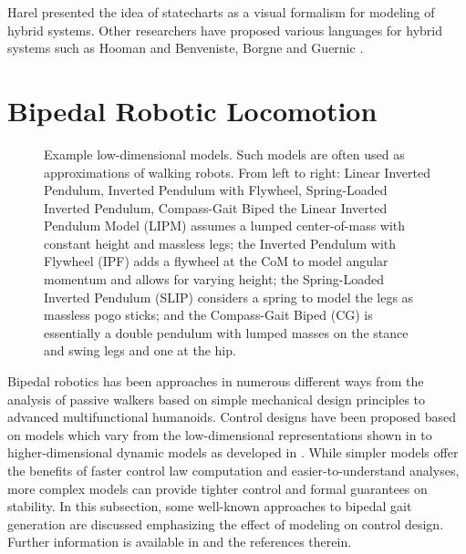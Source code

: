 Harel \cite{Harel1987} presented the idea of statecharts as a visual formalism
for modeling of hybrid systems.
%
Other researchers have proposed various languages for hybrid systems such as
Hooman \cite{Hooman1993} and Benveniste, Borgne and Guernic \cite{Benveniste1993}.




\section{Bipedal Robotic Locomotion} \label{sec:literature-bipeds}

\begin{figure}
  \centering
  \def\svgwidth{1.0\columnwidth}
  
  \caption[Example low-dimensional models.]{%
    Example low-dimensional models.
    Such models are often used as approximations of walking robots.
    From left to right:
    Linear Inverted Pendulum, Inverted Pendulum with Flywheel, Spring-Loaded
    Inverted Pendulum, Compass-Gait Biped
    the Linear Inverted Pendulum Model (LIPM) assumes a lumped center-of-mass
    with constant height and massless legs;
    the Inverted Pendulum with Flywheel (IPF) adds a flywheel at the CoM to
    model angular momentum and allows for varying height;
    the Spring-Loaded Inverted Pendulum (SLIP) considers a spring to model the
    legs as massless pogo sticks;
    and the Compass-Gait Biped (CG) is essentially a double pendulum with
    lumped masses on the stance and swing legs and one at the hip.}
  \label{fig:biped-models}
\end{figure}

Bipedal robotics has been approaches in numerous different ways from the
analysis of passive walkers based on simple mechanical design principles to
advanced multifunctional humanoids.
% 
Control designs have been proposed based on models which vary from the
low-dimensional representations shown in  to
higher-dimensional dynamic models as developed in .
%
While simpler models offer the benefits of faster control law computation and
easier-to-understand analyses, more complex models can provide tighter control
and formal guarantees on stability.
%
In this subsection, some well-known approaches to bipedal gait generation
are discussed emphasizing the effect of modeling on control design.
%
Further information is available in \cite{Chevallereau2009, Full1999,
  Holmes2006, Hurmuzlu2004, Kuo2007, Sadati2012, Siciliano2008, Westervelt2007,
  Wisse2007} and the references therein.


